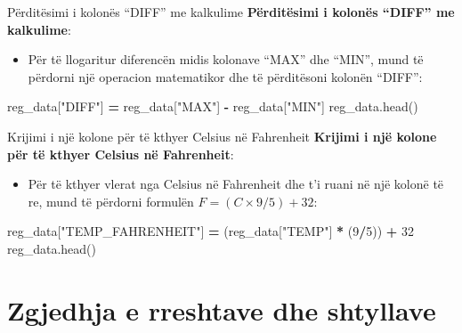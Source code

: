 \documentclass[
  ignorenonframetext,
]{beamer}
\newenvironment{Shaded}{\begin{snugshade}}{\end{snugshade}}
\newcommand{\DecValTok}[1]{\textcolor[rgb]{0.00,0.00,0.81}{#1}}
\newcommand{\NormalTok}[1]{#1}
\newcommand{\OperatorTok}[1]{\textcolor[rgb]{0.81,0.36,0.00}{\textbf{#1}}}
\newcommand{\StringTok}[1]{\textcolor[rgb]{0.31,0.60,0.02}{#1}}
\providecommand{\tightlist}{%
  \setlength{\itemsep}{0pt}\setlength{\parskip}{0pt}}
\begin{document}
\begin{frame}[fragile]{Përditësimi i kolonës ``DIFF'' me kalkulime}
\protect\hypertarget{puxebrdituxebsimi-i-kolonuxebs-diff-me-kalkulime}{}
\textbf{Përditësimi i kolonës ``DIFF'' me kalkulime}:

\begin{itemize}
\tightlist
\item
  Për të llogaritur diferencën midis kolonave ``MAX'' dhe ``MIN'', mund
  të përdorni një operacion matematikor dhe të përditësoni kolonën
  ``DIFF'':
\end{itemize}

\begin{Shaded}
\begin{Highlighting}[]
\NormalTok{    reg\_data[}\StringTok{"DIFF"}\NormalTok{] }\OperatorTok{=}\NormalTok{ reg\_data[}\StringTok{"MAX"}\NormalTok{] }\OperatorTok{{-}}\NormalTok{ reg\_data[}\StringTok{"MIN"}\NormalTok{]}
\NormalTok{    reg\_data.head()}
\end{Highlighting}
\end{Shaded}
\end{frame}

\begin{frame}[fragile]{Krijimi i një kolone për të kthyer Celsius në
Fahrenheit}
\protect\hypertarget{krijimi-i-njuxeb-kolone-puxebr-tuxeb-kthyer-celsius-nuxeb-fahrenheit}{}
\textbf{Krijimi i një kolone për të kthyer Celsius në Fahrenheit}:

\begin{itemize}
\tightlist
\item
  Për të kthyer vlerat nga Celsius në Fahrenheit dhe t'i ruani në një
  kolonë të re, mund të përdorni formulën \(F = (C \times 9/5) + 32\):
\end{itemize}

\begin{Shaded}
\begin{Highlighting}[]
\NormalTok{    reg\_data[}\StringTok{"TEMP\_FAHRENHEIT"}\NormalTok{] }\OperatorTok{=}\NormalTok{ (reg\_data[}\StringTok{"TEMP"}\NormalTok{] }\OperatorTok{*}\NormalTok{ (}\DecValTok{9}\OperatorTok{/}\DecValTok{5}\NormalTok{)) }\OperatorTok{+} \DecValTok{32}
\NormalTok{    reg\_data.head()}
\end{Highlighting}
\end{Shaded}
\end{frame}

\hypertarget{zgjedhja-e-rreshtave-dhe-shtyllave}{%
\section{Zgjedhja e rreshtave dhe
shtyllave}\label{zgjedhja-e-rreshtave-dhe-shtyllave}}
\end{document}
